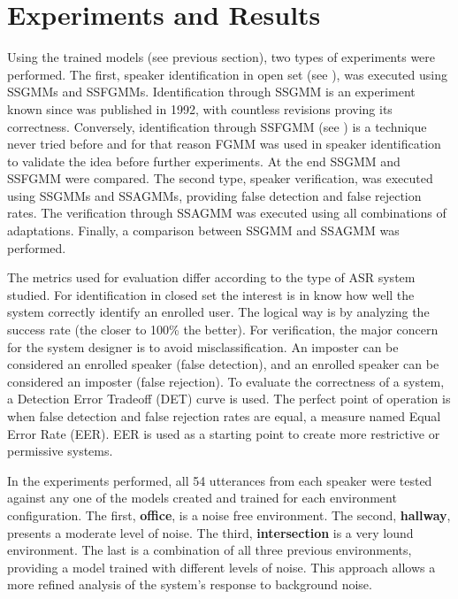 \section{Experiments and Results}
\label{sec:experiments-and-results}

Using the trained models (see previous section), two types of experiments were performed. The first, speaker identification in open set (see ), was executed using SSGMMs and SSFGMMs. Identification through SSGMM is an experiment known since  was published in 1992, with countless revisions proving its correctness. Conversely, identification through SSFGMM (see ) is a technique never tried before and for that reason FGMM was used in speaker identification to validate the idea before further experiments. At the end SSGMM and SSFGMM were compared. The second type, speaker verification, was executed using SSGMMs and SSAGMMs, providing false detection and false rejection rates. The verification through SSAGMM was executed using all combinations of adaptations. Finally, a comparison between SSGMM and SSAGMM was performed.

The metrics used for evaluation differ according to the type of ASR system studied. For identification in closed set the interest is in know how well the system correctly identify an enrolled user. The logical way is by analyzing the success rate (the closer to 100\% the better). For verification, the major concern for the system designer is to avoid misclassification. An imposter can be considered an enrolled speaker (false detection), and an enrolled speaker can be considered an imposter (false rejection). To evaluate the correctness of a system, a Detection Error Tradeoff (DET) curve is used. The perfect point of operation is when false detection and false rejection rates are equal, a measure named Equal Error Rate (EER). EER is used as a starting point to create more restrictive or permissive systems.

In the experiments performed, all 54 utterances from each speaker were tested against any one of the models created and trained for each environment configuration. The first, \textbf{office}, is a noise free environment. The second, \textbf{hallway}, presents a moderate level of noise. The third, \textbf{intersection} is a very lound environment. The last is a combination of all three previous environments, providing a model trained with different levels of noise. This approach allows a more refined analysis of the system's response to background noise.

